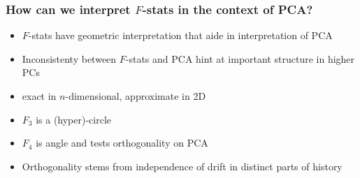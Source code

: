 \documentclass[11pt]{beamer}
\begin{document}
\begin{frame}
	\frametitle{How can we interpret $F$-stats in the context of PCA?}
	\begin{itemize}[<+->]
		\item $F$-stats have geometric interpretation that aide in interpretation of PCA
		\item Inconsistenty between $F$-stats and PCA hint at important structure in higher PCs
		\item exact in $n$-dimensional, approximate in 2D
		\item $F_3$ is a (hyper)-circle
		\item $F_4$ is angle and tests orthogonality on PCA
		\item Orthogonality stems from independence of drift in distinct parts of history
	\end{itemize}
\end{frame}

\end{document}
